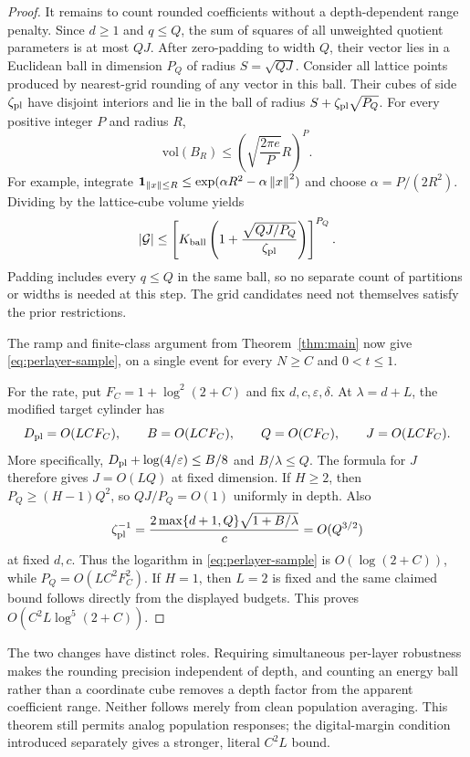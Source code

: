 \begin{proof}
It remains to count rounded coefficients without a depth-dependent range
penalty. Since $d\ge1$ and $q\le Q$, the sum of squares of all unweighted
quotient parameters is at most $QJ$. After zero-padding to width $Q$, their
vector lies in a Euclidean ball in dimension $P_Q$ of radius
$S=\sqrt{QJ}$. Consider all lattice points produced by nearest-grid
rounding of any vector in this ball. Their cubes of side
$\zeta_{\rm pl}$ have disjoint interiors and lie in the ball of radius
$S+\zeta_{\rm pl}\sqrt{P_Q}$.
For every positive integer $P$ and radius $R$,
\[
 \mathrm{vol}(B_R)\le
 \left(\sqrt{\frac{2\pi e}{P}}R\right)^P.
\]
For example, integrate
$\mathbf1_{\left\|x\right\|\le R}\le\exp(\alpha R^2-\alpha\left\|x\right\|^2)$ and
choose $\alpha=P/(2R^2)$. Dividing by the lattice-cube volume yields
\[
 |\mathcal G|\le
 \left[K_{\rm ball}
       \left(1+\frac{\sqrt{QJ/P_Q}}{\zeta_{\rm pl}}\right)\right]^{P_Q}.
\]
Padding includes every $q\le Q$ in the same ball, so no separate count of
partitions or widths is needed at this step. The grid candidates need
not themselves satisfy the prior restrictions.

The ramp and finite-class argument from Theorem~\ref{thm:main} now give
\eqref{eq:perlayer-sample}, on a single event for every $N\ge C$ and
$0<t\le1$.

For the rate, put $F_C=1+\log^2(2+C)$ and fix $d,c,\varepsilon,\delta$.
At $\lambda=d+L$, the modified target cylinder has
\[
 D_{\rm pl}=O(LCF_C),\qquad B=O(LCF_C),\qquad
 Q=O(CF_C),\qquad J=O(LCF_C).
\]
More specifically, $D_{\rm pl}+\log(4/\varepsilon)\le B/8$ and
$B/\lambda\le Q$. The formula for $J$ therefore gives $J=O(LQ)$ at
fixed dimension. If $H\ge2$, then
$P_Q\ge(H-1)Q^2$, so $QJ/P_Q=O(1)$ uniformly in depth. Also
\[
 \zeta_{\rm pl}^{-1}
 =\frac{2\max\{d+1,Q\}\sqrt{1+B/\lambda}}c
 =O(Q^{3/2})
\]
at fixed $d,c$. Thus the logarithm in \eqref{eq:perlayer-sample} is
$O(\log(2+C))$, while $P_Q=O(LC^2F_C^2)$. If $H=1$, then $L=2$
is fixed and the same claimed bound follows directly from the displayed
budgets. This proves $O(C^2L\log^5(2+C))$.
\end{proof}

The two changes have distinct roles. Requiring simultaneous per-layer
robustness makes the rounding precision independent of depth, and counting
an energy ball rather than a coordinate cube removes a depth factor from
the apparent coefficient range. Neither follows merely from clean
population averaging. This theorem still permits analog population
responses; the digital-margin condition introduced separately gives a
stronger, literal $C^2L$ bound.
